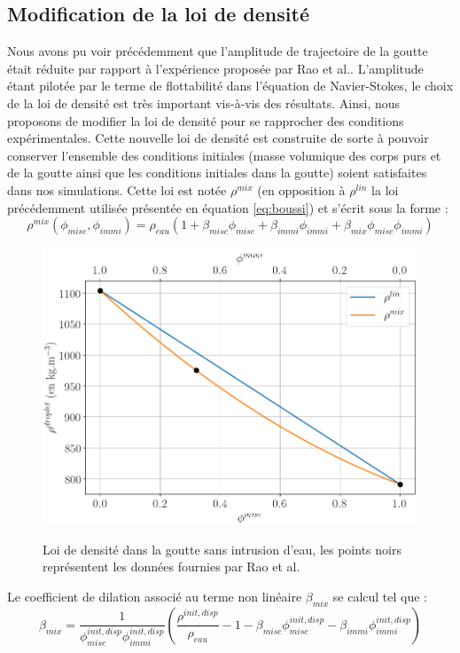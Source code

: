 \subsection{Modification de la loi de densité}
Nous avons pu voir précédemment que l'amplitude de trajectoire de la goutte était réduite par rapport à l'expérience proposée par Rao et al.. L'amplitude étant pilotée par le terme de flottabilité dans l'équation de Navier-Stokes, le choix de la loi de densité est très important vis-à-vis des résultats. Ainsi, nous proposons de modifier la loi de densité pour se rapprocher des conditions expérimentales. Cette nouvelle loi de densité est construite de sorte à pouvoir conserver l'ensemble des conditions initiales (masse volumique des corps purs et de la goutte ainsi que les conditions initiales dans la goutte) soient satisfaites dans nos simulations. Cette loi est notée $\rho^{mix}$ (en opposition à $\rho^{lin}$ la loi précédemment utilisée présentée en équation \ref{eq:boussi}) et s'écrit sous la forme :
\begin{equation*}
\rho^{mix}({\phi_{misc},\phi_{immi}}) = \rho_{eau} \left(   1 + \beta_{misc}\phi_{misc} +\beta_{immi} \phi_{immi} + \beta_{mix}\phi_{misc}\phi_{immi} \right)
\end{equation*} \vspace{-1cm}
\begin{figure}[H]
	\centering
	\includegraphics[width=0.65\linewidth]{figure/rho_droplet}
	\label{fig:rhodroplet}
	\caption{Loi de densité dans la goutte sans intrusion d'eau, les points noirs représentent les données fournies par Rao et al. \cite{rao_influence_2015}}
\end{figure}
Le coefficient de dilation associé au terme non linéaire $\beta_{mix}$ se calcul tel que :
\begin{equation}
	\beta_{mix} = \frac{1}{\phi_{misc}^{init,disp}\phi_{immi}^{init,disp}} \left(\frac{\rho^{init,disp}}{\rho_{eau}}- 1 - \beta_{misc} \phi_{misc}^{init,disp} - \beta_{immi} \phi_{immi}^{init,disp}\right)
\end{equation}
